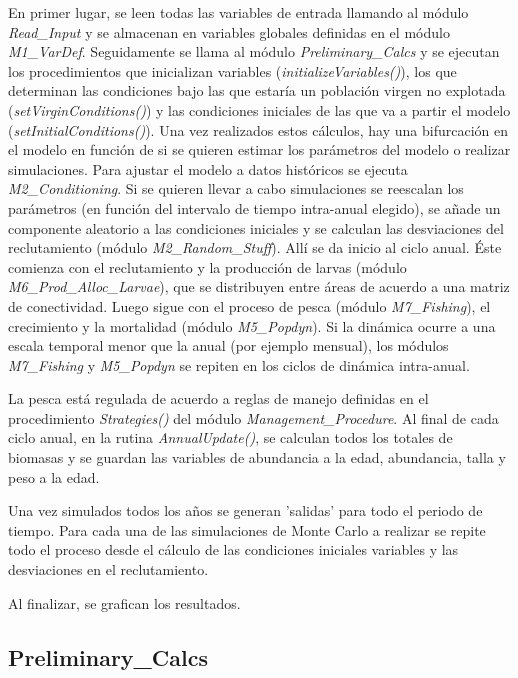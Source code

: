 		En primer lugar, se leen todas las variables de entrada llamando al módulo \emph{Read\_Input} y se almacenan en variables globales definidas en el módulo \emph{M1\_VarDef}. 
		Seguidamente se llama al módulo \emph{Preliminary\_Calcs} y se ejecutan los procedimientos que inicializan variables (\emph{initializeVariables()}), los que determinan las condiciones bajo las que estaría un población virgen no explotada (\emph{setVirginConditions()}) y las condiciones iniciales de las que va a partir el modelo (\emph{setInitialConditions()}). 
		Una vez realizados estos cálculos, hay una bifurcación en el modelo en función de si se quieren estimar los parámetros del modelo o realizar simulaciones. 
		Para ajustar el modelo a datos históricos se ejecuta \emph{M2\_Conditioning}. 
		Si se quieren llevar a cabo simulaciones se reescalan los parámetros (en función del intervalo de tiempo intra-anual elegido), se añade un componente aleatorio a las condiciones iniciales y se calculan las desviaciones del reclutamiento (módulo \emph{M2\_Random\_Stuff}). Allí se da inicio al ciclo anual. Éste comienza con el reclutamiento y la producción de larvas (módulo \emph{M6\_Prod\_Alloc\_Larvae}), que se distribuyen entre áreas de acuerdo a una matriz de conectividad. Luego sigue con el proceso de pesca (módulo \emph{M7\_Fishing}), el crecimiento y la mortalidad (módulo \emph{M5\_Popdyn}). Si la dinámica ocurre a una escala temporal menor que la anual (por ejemplo mensual), los módulos \emph{M7\_Fishing} y \emph{M5\_Popdyn} se repiten en los ciclos de dinámica intra-anual. 
		\par La pesca está regulada de acuerdo a reglas de manejo definidas en el procedimiento \emph{Strategies()} del módulo \emph{Management\_Procedure}.   
		Al final de cada ciclo anual, en la rutina \emph{AnnualUpdate()}, se calculan todos los totales de biomasas y se guardan las variables de abundancia a la edad, abundancia, talla y peso a la edad. 

		Una vez simulados todos los años se generan 'salidas' para todo el periodo de tiempo.
		Para cada una de las simulaciones de Monte Carlo a realizar se repite todo el proceso desde el cálculo de las condiciones iniciales variables y las desviaciones en el reclutamiento. 

		Al finalizar, se grafican los resultados.
		
		\subsection{Preliminary\_Calcs}
